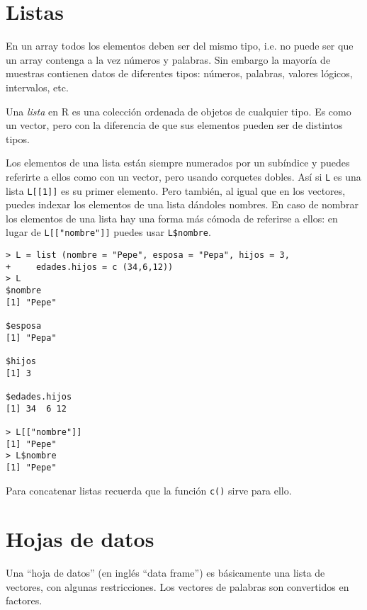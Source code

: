 \section{Listas}


En un  array todos  los elementos  deben ser del  mismo tipo,  i.e. no
puede  ser que  un array  contenga a  la vez  números y  palabras. Sin
embargo la  mayoría de muestras  contienen datos de  diferentes tipos:
números, palabras, valores lógicos, intervalos, etc.

Una {\em  lista} en {\sf  R} es una  colección ordenada de  objetos de
cualquier tipo. Es  como un vector, pero con la  diferencia de que sus
elementos pueden ser de distintos tipos. 

Los elementos de una lista están  siempre numerados por un subíndice y
puedes referirte  a ellos  como con un  vector, pero  usando corquetes
dobles.  Así  si {\tt  L}  es  una lista  {\tt  L[[1]]}  es su  primer
elemento. Pero también,  al igual que en los  vectores, puedes indexar
los elementos  de una lista dándoles  nombres. En caso de  nombrar los
elementos de una lista hay una  forma más cómoda de referirse a ellos:
en lugar de {\tt L[["nombre"]]} puedes usar {\tt L\$nombre}.


\begin{verbatim}
> L = list (nombre = "Pepe", esposa = "Pepa", hijos = 3,
+     edades.hijos = c (34,6,12))
> L
$nombre
[1] "Pepe"

$esposa
[1] "Pepa"

$hijos
[1] 3

$edades.hijos
[1] 34  6 12

> L[["nombre"]]
[1] "Pepe"
> L$nombre
[1] "Pepe"
\end{verbatim}

Para concatenar  listas recuerda que  la función {\tt c()}  sirve para
ello.

\section{Hojas de datos}


Una ``hoja  de datos'' (en  inglés ``data frame'') es  básicamente una
lista de vectores, con algunas restricciones. Los vectores de palabras
son convertidos en factores.

